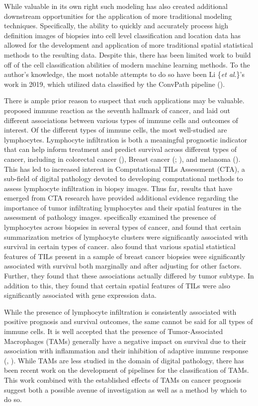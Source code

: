 \documentclass[
]{book}
\begin{document}
While valuable in its own right such modeling has also created
additional downstream opportunities for the application of more
traditional modeling techniques. Specifically, the ability to
quickly and accurately process high definition images of biopsies
into cell level classification and location data has allowed for
the development and application of more traditional spatial
statistical methods to the resulting data. Despite this, there has been limited work to
build off of the cell classification abilities of modern machine
learning methods. To the author's knowledge, the most notable
attempts to do so have been Li \{\textit{et al}.\}'s work in 2019,
which utilized data classified by the ConvPath pipeline
(\citet{Wang19}).

There is ample prior reason to suspect that such applications may
be valuable. \citet{Pages10} proposed immune reaction as the seventh hallmark of cancer, and laid out different associations between various types of immune cells and outcomes of interest. Of the different types of immune cells, the most well-studied are lymphocytes.
Lymphocyte infiltration is both
a meaningful prognostic indicator that can help inform treatment
and predict survival across different types of cancer, including
in colorectal cancer (\citet{Idos20}), Breast cancer
(\citet{Dieci18}; \citet{Denkert15}), and melanoma
(\citet{Fu19}). This has led to increased interest in Computational
TILs Assessment (CTA), a sub-field of digital pathology devoted to
developing computational methods to assess lymphocyte infiltration
in biopsy images. Thus far, results that have emerged from CTA
research have provided additional evidence regarding the importance of
tumor infiltrating lymphocytes and their spatial
features in the assessment of pathology images.
\citet{Saltz18} specifically
examined the presence of lymphocytes across biopsies in
several types of cancer, and found that certain summarization
metrics of lymphocyte clusters were significantly associated
with survival in certain types of cancer. \citet{Lu20} also
found that various spatial statistical features of TILs present
in a sample of breast cancer biopsies were significantly associated
with survival both marginally and after adjusting for other factors.
Further, they found that these associations actually differed by
tumor subtype. In addition to this, they found that certain
spatial features of TILs were also significantly associated with
gene expression data.

While the presence of lymphocyte infiltration is consistently associated with positive prognosis and survival outcomes, the same cannot be said for all types of immune cells. It is well accepted that the presence of Tumor-Associated Macrophages (TAMs) generally have a negative impact on survival due to their association with inflammation and their inhibition of adaptive immune response (\citet{Sica08}, \citet{Tsutsui05}). While TAMs are less studied in the domain of digital pathology, there has been recent work on the development of pipelines for the classification of TAMs. This work combined with the established effects of TAMs on cancer prognosis suggest both a possible avenue of investigation as well as a method by which to do so.
\end{document}
